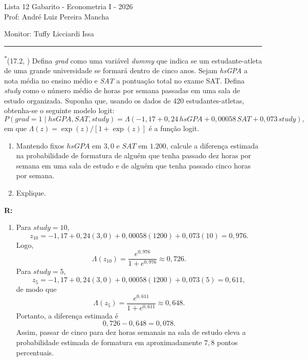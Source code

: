 \documentclass[12pt,letterpaper,onecolumn]{exam}
\renewenvironment{solution}
{\par\noindent\textbf{R:}\enspace\color{blue}}
{\par\color{black}}
\begin{document}
\begingroup
    \centering
    \LARGE Lista 12 Gabarito - Econometria I - 2026\\[0.5em]
    \large Prof: André Luiz Pereira Mancha \par
    \large Monitor: Tuffy Licciardi Issa \par
\endgroup
\rule{\textwidth}{0.4pt}
\pointsdroppedatright
\printanswers
\renewcommand{\solutiontitle}{\noindent\textbf{Ans:}\enspace}
\newcommand{\qstar}{\hspace{-0.6em}\textsuperscript{*}\hspace{0.2em}}

\begin{questions}

\question\qstar (17.2, \citep{wooldridge2016}) Defina \textit{grad} como uma variável \textit{dummy} que indica se um estudante-atleta de uma grande universidade se formará dentro de cinco anos. Sejam \textit{hsGPA} a nota média no ensino médio e \textit{SAT} a pontuação total no exame SAT. Defina \textit{study} como o número médio de horas por semana passadas em uma sala de estudo organizada. Suponha que, usando os dados de 420 estudantes-atletas, obtenha-se o seguinte modelo logit:
\[
P(grad = 1 \mid hsGPA, SAT, study)
=
\Lambda(-1{,}17 + 0{,}24\,hsGPA + 0{,}00058\,SAT + 0{,}073\,study),
\]
em que \(\Lambda(z)=\exp(z)/[1+\exp(z)]\) é a função logit.
\begin{enumerate}[label=(\roman*)]
    \item Mantendo fixos \(hsGPA\) em \(3{,}0\) e \(SAT\) em \(1.200\), calcule a diferença estimada na probabilidade de formatura de alguém que tenha passado dez horas por semana em uma sala de estudo e de alguém que tenha passado cinco horas por semana.
    \item Explique.
\end{enumerate}

\begin{solution}
\begin{enumerate}[label=(\roman*)]
    \item Para \(study=10\),
    \[
    z_{10}=-1{,}17+0{,}24(3{,}0)+0{,}00058(1200)+0{,}073(10)=0{,}976.
    \]
    Logo,
    \[
    \Lambda(z_{10})=\frac{e^{0{,}976}}{1+e^{0{,}976}}\approx 0{,}726.
    \]
    Para \(study=5\),
    \[
    z_{5}=-1{,}17+0{,}24(3{,}0)+0{,}00058(1200)+0{,}073(5)=0{,}611,
    \]
    de modo que
    \[
    \Lambda(z_{5})=\frac{e^{0{,}611}}{1+e^{0{,}611}}\approx 0{,}648.
    \]
    Portanto, a diferença estimada é
    \[
    0{,}726-0{,}648=0{,}078.
    \]
    Assim, passar de cinco para dez horas semanais na sala de estudo eleva a probabilidade estimada de formatura em aproximadamente \(7{,}8\) pontos percentuais.


\end{enumerate}
\end{solution}
\end{questions}
\end{document}
